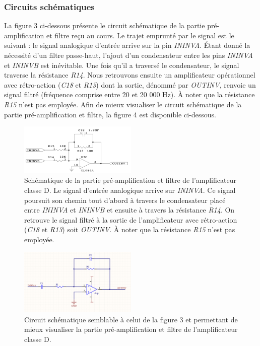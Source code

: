\documentclass[10pt, oneside, a4paper]{article}
\begin{document}
\subsubsection{Circuits schématiques}
La figure 3 ci-dessous présente le circuit schématique de la partie pré-amplification et filtre reçu au cours. Le trajet emprunté par le signal est le suivant : le signal analogique d'entrée arrive sur la pin \textit{ININVA}. Étant donné la nécessité d'un filtre passe-haut, l'ajout d'un condensateur entre les pins \textit{ININVA} et \textit{ININVB} est inévitable. Une fois qu'il a traversé le condensateur, le signal traverse la résistance \textit{R14}. Nous retrouvons ensuite un amplificateur opérationnel avec rétro-action (\textit{C18} et \textit{R13}) dont la sortie, dénommé par \textit{OUTINV}, renvoie un signal filtré (fréquence comprise entre 20 et 20 000 Hz). À noter que la résistance \textit{R15} n'est pas employée.
Afin de mieux visualiser le circuit schématique de la partie pré-amplification et filtre, la figure 4 est disponible ci-dessous.

\begin{figure}
    \centering
    \includegraphics[width=0.5\textwidth]{image/schematique-all-1.jpg}
    \caption{Schématique de la partie pré-amplification et filtre de l'amplificateur classe D. 
             Le signal d'entrée analogique arrive sur \textit{ININVA}. Ce signal poursuit son chemin tout d'abord à travers le condensateur placé entre \textit{ININVA} et \textit{ININVB} et ensuite à travers la résistance \textit{R14}. On retrouve le signal filtré à la sortie de l'amplificateur avec rétro-action (\textit{C18} et \textit{R13}) soit \textit{OUTINV}. À noter que la résistance \textit{R15} n'est pas employée.}
\end{figure}

\begin{figure}
    \centering
    \includegraphics[width=0.5\textwidth]{image/schematique-all-2.jpg}
    \caption{Circuit schématique semblable à celui de la figure 3 et permettant de mieux visualiser la partie pré-amplification et filtre de l'amplificateur classe D.}
\end{figure}
\end{document}
